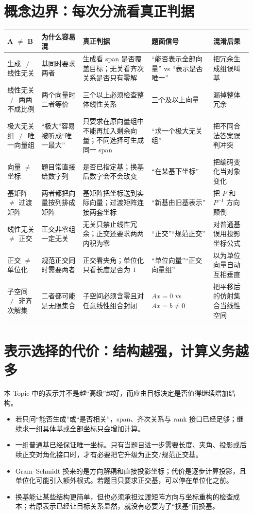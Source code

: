 \documentclass[11pt,a4paper]{ctexart}
\begin{document}
\section{概念边界：每次分流看真正判据}

\small
\begin{longtable}{L{3.15cm}L{3.15cm}L{3.65cm}L{3.15cm}L{2.7cm}}
\toprule
\textbf{A $\neq$ B} & \textbf{为什么容易混} & \textbf{真正判据} & \textbf{题面信号} & \textbf{混淆后果}\\
\midrule
生成 $\neq$ 线性无关 & 基同时要求两者 & 生成看 span 是否覆盖目标；无关看齐次关系是否只有零解 & “能否表示全部向量” vs “表示是否唯一” & 把冗余生成组误叫基\\
线性无关 $\neq$ 两两不成比例 & 两个向量时二者等价 & 三个以上必须检查整体线性关系 & 三个及以上向量 & 漏掉整体冗余\\
极大无关组 $\neq$ 唯一向量组 & “极大”容易被听成“唯一最大” & 只要求在原向量组中不能再加入剩余向量；不同选择可生成同一 span & “求一个极大无关组” & 把不同合法答案误判冲突\\
向量 $\neq$ 坐标 & 题目常直接给数字列 & 是否已指定基；换基后数字会不会改变 & “在某基下坐标” & 把编码变化当对象变化\\
基矩阵 $\neq$ 过渡矩阵 & 两者都把向量按列排成矩阵 & 基矩阵把坐标送到实际向量；过渡矩阵连接两套坐标 & “新基由旧基表示” & 把 $P$ 和 $P^{-1}$ 方向颠倒\\
线性无关 $\neq$ 正交 & 正交非零组一定无关 & 无关只禁止线性冗余；正交还要求两两内积为零 & “正交”“规范正交” & 对普通基误用投影坐标公式\\
正交 $\neq$ 单位化 & 规范正交同时需要两者 & 正交看夹角；单位化只看长度是否为 $1$ & “单位向量”“正交向量组” & 以为单位向量自动互相垂直\\
子空间 $\neq$ 非齐次解集 & 二者都可能是无限集合 & 子空间必须含零且对任意线性组合封闭 & $Ax=0$ vs $Ax=b\neq0$ & 把平移后的仿射集合当线性空间\\
\bottomrule
\end{longtable}
\normalsize

\section{表示选择的代价：结构越强，计算义务越多}

本 Topic 中的表示并不是越“高级”越好，而应由目标决定是否值得继续增加结构。

\begin{itemize}
  \item 若只问“能否生成”或“是否相关”，span、齐次关系与 rank 接口已经足够；继续求一组具体基或全部坐标只会增加计算。
  \item 一组普通基已经保证唯一坐标。只有当题目进一步需要长度、夹角、投影或后续正交对角化接口时，才有必要把它升级为正交/规范正交基。
  \item Gram--Schmidt 换来的是方向解耦和直接投影坐标；代价是逐步计算投影，且单位化可能引入额外根式。若题目只要求正交基，可以停在单位化之前。
  \item 换基能让某些结构更简单，但也必须承担过渡矩阵方向与坐标重构的检查成本；若原表示已经让目标关系显然，就没有必要为了“换基”而换基。
\end{itemize}
\end{document}
